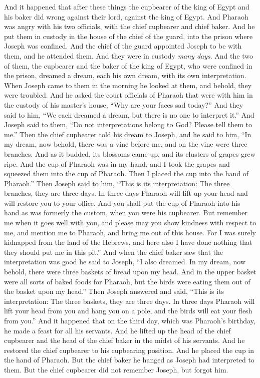 \begin{biblechapter} %
 And it happened that after these things the cupbearer of the king of Egypt and his baker did wrong against their lord, against the king of Egypt.
\verse And Pharaoh was angry with his two officials, with the chief cupbearer and chief baker.
\verse And he put them in custody in the house of the chief of the guard, into the prison where Joseph was confined.
\verse And the chief of the guard appointed Joseph to be with them, and he attended them. And they were in custody \textit{many days}.
\verse And the two of them, the cupbearer and the baker of the king of Egypt, who were confined in the prison, dreamed a dream, each his own dream, with its own interpretation.
\verse When Joseph came to them in the morning he looked at them, and behold, they were troubled.
\verse And he asked the court officials of Pharaoh that were with him in the custody of his master’s house, “Why are your faces sad today?”
\verse And they said to him, “We each dreamed a dream, but there is no one to interpret it.” And Joseph said to them, “Do not interpretations belong to God? Please tell them to me.”
\verse Then the chief cupbearer told his dream to Joseph, and he said to him, “In my dream, now behold, there was a vine before me,
\verse and on the vine were three branches. And as it budded, its blossoms came up, and its clusters of grapes grew ripe.
\verse And the cup of Pharaoh was in my hand, and I took the grapes and squeezed them into the cup of Pharaoh. Then I placed the cup into the hand of Pharaoh.”
\verse Then Joseph said to him, “This is its interpretation: The three branches, they are three days.
\verse In three days Pharaoh will lift up your head and will restore you to your office. And you shall put the cup of Pharaoh into his hand as was formerly the custom, when you were his cupbearer.
\verse But remember me when it goes well with you, and please may you show kindness with respect to me, and mention me to Pharaoh, and bring me out of this house.
\verse For I was surely kidnapped from the land of the Hebrews, and here also I have done nothing that they should put me in this pit.”
\verse And when the chief baker saw that the interpretation was good he said to Joseph, “I also dreamed. In my dream, now behold, there were three baskets of bread upon my head.
\verse And in the upper basket were all sorts of baked foods for Pharaoh, but the birds were eating them out of the basket upon my head.”
\verse Then Joseph answered and said, “This is its interpretation: The three baskets, they are three days.
\verse In three days Pharaoh will lift your head from you and hang you on a pole, and the birds will eat your flesh from you.”
\verse And it happened that on the third day, which was Pharaoh’s birthday, he made a feast for all his servants. And he lifted up the head of the chief cupbearer and the head of the chief baker in the midst of his servants.
\verse And he restored the chief cupbearer to his cupbearing position. And he placed the cup in the hand of Pharaoh.
\verse But the chief baker he hanged as Joseph had interpreted to them.
\verse But the chief cupbearer did not remember Joseph, but forgot him.
\end{biblechapter}

